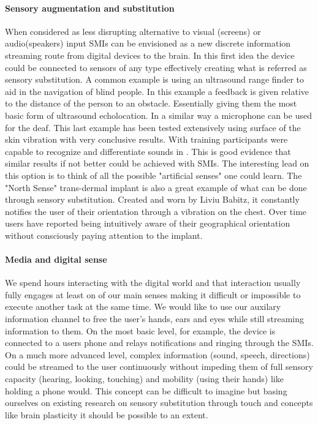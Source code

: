 \documentclass[10pt,journal,compsoc]{IEEEtran}
\begin{document}
	\paragraph{Sensory augmentation and substitution}
	When considered as less disrupting alternative to visual (screens) or audio(speakers) input SMIs can be envisioned as a new discrete information streaming route from digital devices to the brain. 
	In this first idea the device could be connected to sensors of any type effectively creating what is referred as sensory substitution. A common example is using an ultrasound range finder to aid in the navigation of blind people. In this example a feedback is given relative to the distance of the person to an obstacle. Essentially giving them the most basic form of ultrasound echolocation. In a similar way a microphone can be used for the deaf. 
	This last example has been tested extensively using surface of the skin vibration with very conclusive results. With training participants were capable to recognize and differentiate sounds in \cite{perrotta2021neuroscience}. This is good evidence that similar results if not better could be achieved with SMIs. The interesting lead on this option is to think of all the possible "artificial senses" one could learn. The "North Sense" trans-dermal implant is also a great example of what can be done through sensory substitution. Created and worn by Liviu Babitz, it constantly notifies the user of their orientation through a vibration on the chest. Over time users have reported being intuitively aware of their geographical orientation without consciously paying attention to the implant.
	\paragraph{Media and digital sense}
	We spend hours interacting with the digital world and that interaction usually fully engages at least on of our main senses making it difficult or impossible to execute another task at the same time. We would like to use our auxilary information channel to free the user's hands, ears and eyes while still streaming information to them.
	On the most basic level, for example, the device is connected to a users phone and relays notifications and ringing through the SMIs. On a much more advanced level, complex information (sound, speech, directions) could be streamed to the user continuously without impeding them of full sensory capacity (hearing, looking, touching) and mobility (using their hands) like holding a phone would.
	This concept can be difficult to imagine but basing ourselves on existing research on sensory substitution through touch and concepts like brain plasticity it should be possible to an extent.
	
\end{document}
